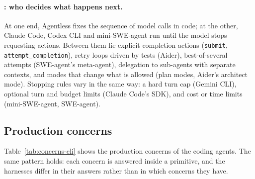 \paragraph{: who decides what happens next.} At one end, Agentless fixes the sequence of model calls in code; at the other, Claude Code, Codex CLI and mini-SWE-agent run until the model stops requesting actions. Between them lie explicit completion actions (\texttt{submit}, \texttt{attempt\_completion}), retry loops driven by tests (Aider), best-of-several attempts (SWE-agent's meta-agent), delegation to sub-agents with separate contexts, and modes that change what is allowed (plan modes, Aider's architect mode). Stopping rules vary in the same way: a hard turn cap (Gemini CLI), optional turn and budget limits (Claude Code's SDK), and cost or time limits (mini-SWE-agent, SWE-agent).

\subsection{Production concerns}

Table~\ref{tab:concerns-cli} shows the production concerns of the coding agents. The same pattern holds: each concern is answered inside a primitive, and the harnesses differ in their answers rather than in which concerns they have.


